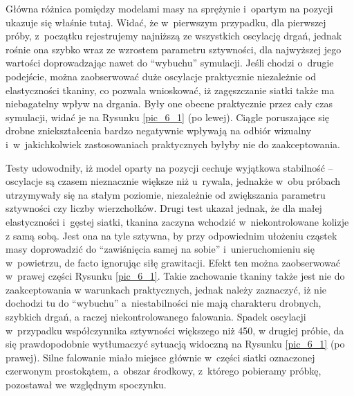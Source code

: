		
		Główna różnica pomiędzy modelami masy na sprężynie i~opartym na pozycji ukazuje się właśnie tutaj. Widać, że w~pierwszym przypadku, dla pierwszej próby, z~początku rejestrujemy najniższą ze wszystkich oscylację drgań, jednak rośnie ona szybko wraz ze wzrostem parametru sztywności, dla najwyższej jego wartości doprowadzając nawet do ``wybuchu'' symulacji. Jeśli chodzi o~drugie podejście, można zaobserwować duże oscylacje praktycznie niezależnie od elastyczności tkaniny, co pozwala wnioskować, iż zagęszczanie siatki także ma niebagatelny wpływ na drgania. Były one obecne praktycznie przez cały czas symulacji, widać je na Rysunku \ref{pic_6_1} (po lewej). Ciągle poruszające się drobne zniekształcenia bardzo negatywnie wpływają na odbiór wizualny i~w~jakichkolwiek zastosowaniach praktycznych byłyby nie do zaakceptowania.
		
		Testy udowodniły, iż model oparty na pozycji cechuje wyjątkowa stabilność -- oscylacje są czasem nieznacznie większe niż u~rywala, jednakże w~obu próbach utrzymywały się na stałym poziomie, niezależnie od zwiększania parametru sztywności czy liczby wierzchołków. Drugi test ukazał jednak, że dla małej elastyczności i~gęstej siatki, tkanina zaczyna wchodzić w~niekontrolowane kolizje z samą sobą. Jest ona na tyle sztywna, by przy odpowiednim ułożeniu cząstek masy doprowadzić do ``zawiśnięcia samej na sobie'' i~unieruchomieniu się w~powietrzu, de facto ignorując siłę grawitacji. Efekt ten można zaobserwować w~prawej części Rysunku \ref{pic_6_1}. Takie zachowanie tkaniny także jest nie do zaakceptowania w warunkach praktycznych, jednak należy zaznaczyć, iż nie dochodzi tu do ``wybuchu'' a~niestabilności nie mają charakteru drobnych, szybkich drgań, a raczej niekontrolowanego falowania. Spadek oscylacji w~przypadku współczynnika sztywności większego niż 450, w drugiej próbie, da się prawdopodobnie wytłumaczyć sytuacją widoczną na Rysunku \ref{pic_6_1} (po prawej). Silne falowanie miało miejsce głównie w~części siatki oznaczonej czerwonym prostokątem, a~obszar środkowy, z~którego pobieramy próbkę, pozostawał we względnym spoczynku.
		
		
		
		
